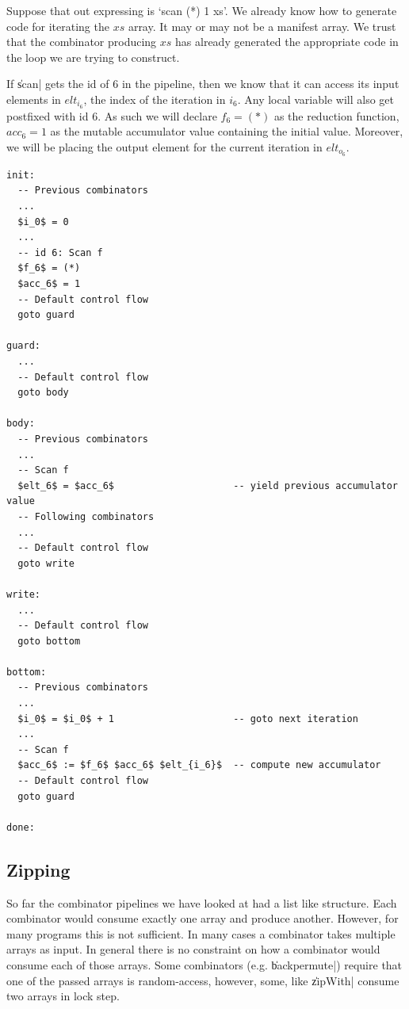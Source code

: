 \documentclass[preamble.tex]{subfiles}
\begin{document}
Suppose that out expressing is `scan (*) 1 xs'. We already know how to generate code for iterating the $xs$ array. It may or may not be a manifest array. We trust that the combinator producing $xs$ has already generated the appropriate code in the loop we are trying to construct.

If \|scan| gets the id of 6 in the pipeline, then we know that it can access its input elements in $elt_{i_6}$, the index of the iteration in $i_6$. Any local variable will also get postfixed with id 6. As such we will declare $f_6 = (*)$ as the reduction function, $acc_6 = 1$ as the mutable accumulator value containing the initial value. Moreover, we will be placing the output element for the current iteration in $elt_{o_6}$.

\begin{lstlisting}[mathescape]
init:
  -- Previous combinators
  ...
  $i_0$ = 0
  ...
  -- id 6: Scan f
  $f_6$ = (*)
  $acc_6$ = 1
  -- Default control flow
  goto guard

guard:
  ...
  -- Default control flow
  goto body

body:
  -- Previous combinators
  ...
  -- Scan f
  $elt_6$ = $acc_6$                     -- yield previous accumulator value
  -- Following combinators
  ...
  -- Default control flow
  goto write

write:
  ...
  -- Default control flow
  goto bottom

bottom:
  -- Previous combinators
  ...
  $i_0$ = $i_0$ + 1                     -- goto next iteration
  ...
  -- Scan f
  $acc_6$ := $f_6$ $acc_6$ $elt_{i_6}$  -- compute new accumulator
  -- Default control flow
  goto guard

done:

\end{lstlisting}

\subsection{Zipping}

So far the combinator pipelines we have looked at had a list like structure. Each combinator would consume exactly one array and produce another. However, for many programs this is not sufficient. In many cases a combinator takes multiple arrays as input. In general there is no constraint on how a combinator would consume each of those arrays. Some combinators (e.g. \|backpermute|) require that one of the passed arrays is random-access, however, some, like \|zipWith| consume two arrays in lock step.
\end{document}
